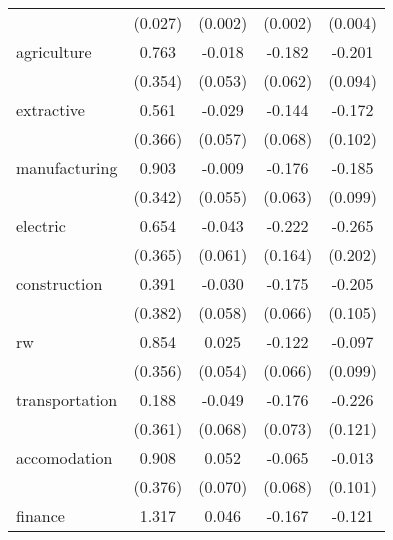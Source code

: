{\begin{tabular}{l*{4}{c}}
            &     (0.027)         &     (0.002)         &     (0.002)         &     (0.004)         \\
[1em]
agriculture &       0.763\sym{**} &      -0.018         &      -0.182\sym{***}&      -0.201\sym{**} \\
            &     (0.354)         &     (0.053)         &     (0.062)         &     (0.094)         \\
[1em]
extractive  &       0.561         &      -0.029         &      -0.144\sym{**} &      -0.172         \\
            &     (0.366)         &     (0.057)         &     (0.068)         &     (0.102)         \\
[1em]
manufacturing&       0.903\sym{**} &      -0.009         &      -0.176\sym{**} &      -0.185\sym{*}  \\
            &     (0.342)         &     (0.055)         &     (0.063)         &     (0.099)         \\
[1em]
electric    &       0.654\sym{*}  &      -0.043         &      -0.222         &      -0.265         \\
            &     (0.365)         &     (0.061)         &     (0.164)         &     (0.202)         \\
[1em]
construction&       0.391         &      -0.030         &      -0.175\sym{**} &      -0.205\sym{*}  \\
            &     (0.382)         &     (0.058)         &     (0.066)         &     (0.105)         \\
[1em]
rw          &       0.854\sym{**} &       0.025         &      -0.122\sym{*}  &      -0.097         \\
            &     (0.356)         &     (0.054)         &     (0.066)         &     (0.099)         \\
[1em]
transportation&       0.188         &      -0.049         &      -0.176\sym{**} &      -0.226\sym{*}  \\
            &     (0.361)         &     (0.068)         &     (0.073)         &     (0.121)         \\
[1em]
accomodation&       0.908\sym{**} &       0.052         &      -0.065         &      -0.013         \\
            &     (0.376)         &     (0.070)         &     (0.068)         &     (0.101)         \\
[1em]
finance     &       1.317\sym{*}  &       0.046         &      -0.167         &      -0.121         \\

\end{tabular}}
